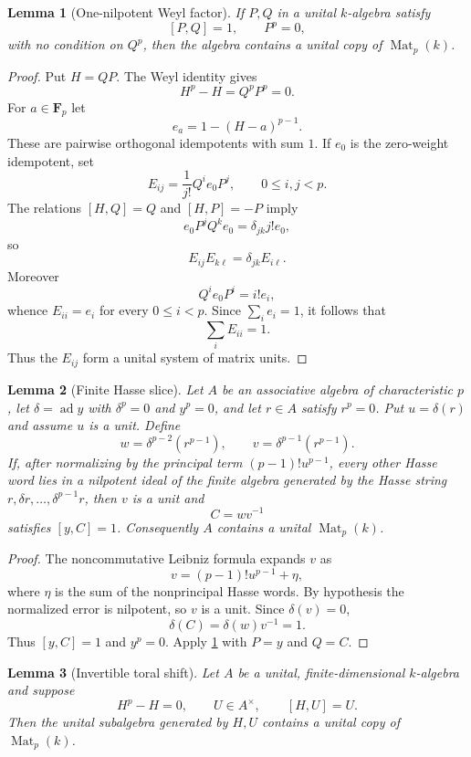 \documentclass[11pt,reqno]{amsart}
\newtheorem{lemma}[lemma]{Lemma}
\theoremstyle{definition}
\theoremstyle{remark}
\theoremstyle{definition}
\newcommand{\Mat}{\operatorname{Mat}}
\newcommand{\ad}{\operatorname{ad}}
\newcommand{\Fp}{\mathbf F_p}
\begin{document}
\begin{lemma}[One-nilpotent Weyl factor]\label{lem:one-nilpotent}
If $P,Q$ in a unital $k$-algebra satisfy
\[
 [P,Q]=1,\qquad P^p=0,
\]
with no condition on $Q^p$, then the algebra contains a unital copy of
$\Mat_p(k)$.
\end{lemma}

\begin{proof}
Put $H=QP$.  The Weyl identity gives
\[
 H^p-H=Q^pP^p=0.
\]
For $a\in\Fp$ let
\[
 e_a=1-(H-a)^{p-1}.
\]
These are pairwise orthogonal idempotents with sum $1$.  If $e_0$ is the
zero-weight idempotent, set
\[
 E_{ij}=\frac1{j!}Q^ie_0P^j,
 \qquad 0\le i,j<p.
\]
The relations $[H,Q]=Q$ and $[H,P]=-P$ imply
\[
 e_0P^jQ^ke_0=\delta_{jk}j!e_0,
\]
so
\[
 E_{ij}E_{k\ell}=\delta_{jk}E_{i\ell}.
\]
Moreover
\[
 Q^ie_0P^i=i!e_i,
\]
whence $E_{ii}=e_i$ for every $0\le i<p$.  Since
$\sum_i e_i=1$, it follows that
\[
 \sum_iE_{ii}=1.
\]
Thus the $E_{ij}$ form a unital system of matrix units.
\end{proof}

\begin{lemma}[Finite Hasse slice]\label{lem:hasse-slice}
Let $A$ be an associative algebra of characteristic $p$, let
$\delta=\ad y$ with $\delta^p=0$ and $y^p=0$, and let $r\in A$ satisfy
$r^p=0$.  Put $u=\delta(r)$ and assume $u$ is a unit.  Define
\[
 w=\delta^{p-2}(r^{p-1}),
 \qquad v=\delta^{p-1}(r^{p-1}).
\]
If, after normalizing by the principal term $(p-1)!u^{p-1}$, every other
Hasse word lies in a nilpotent ideal of the finite algebra generated by the
Hasse string $r,\delta r,\ldots,\delta^{p-1}r$, then $v$ is a unit and
\[
 C=wv^{-1}
\]
satisfies $[y,C]=1$.  Consequently $A$ contains a unital
$\Mat_p(k)$.
\end{lemma}

\begin{proof}
The noncommutative Leibniz formula expands $v$ as
\[
 v=(p-1)!u^{p-1}+\eta,
\]
where $\eta$ is the sum of the nonprincipal Hasse words.  By hypothesis the
normalized error is nilpotent, so $v$ is a unit.  Since $\delta(v)=0$,
\[
 \delta(C)=\delta(w)v^{-1}=1.
\]
Thus $[y,C]=1$ and $y^p=0$.  Apply \cref{lem:one-nilpotent} with
$P=y$ and $Q=C$.
\end{proof}

\begin{lemma}[Invertible toral shift]\label{lem:toral-shift-strong}
Let $A$ be a unital, \emph{finite-dimensional} $k$-algebra and suppose
\[
 H^p-H=0,\qquad U\in A^\times,\qquad [H,U]=U.
\]
Then the unital subalgebra generated by $H,U$ contains a unital copy of
$\Mat_p(k)$.
\end{lemma}
\end{document}
